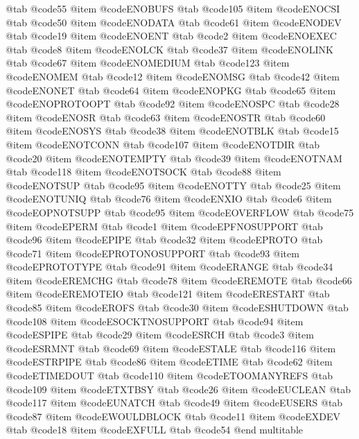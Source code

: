 @tab @code{55}
@item @code{ENOBUFS}
@tab @code{105}
@item @code{ENOCSI}
@tab @code{50}
@item @code{ENODATA}
@tab @code{61}
@item @code{ENODEV}
@tab @code{19}
@item @code{ENOENT}
@tab @code{2}
@item @code{ENOEXEC}
@tab @code{8}
@item @code{ENOLCK}
@tab @code{37}
@item @code{ENOLINK}
@tab @code{67}
@item @code{ENOMEDIUM}
@tab @code{123}
@item @code{ENOMEM}
@tab @code{12}
@item @code{ENOMSG}
@tab @code{42}
@item @code{ENONET}
@tab @code{64}
@item @code{ENOPKG}
@tab @code{65}
@item @code{ENOPROTOOPT}
@tab @code{92}
@item @code{ENOSPC}
@tab @code{28}
@item @code{ENOSR}
@tab @code{63}
@item @code{ENOSTR}
@tab @code{60}
@item @code{ENOSYS}
@tab @code{38}
@item @code{ENOTBLK}
@tab @code{15}
@item @code{ENOTCONN}
@tab @code{107}
@item @code{ENOTDIR}
@tab @code{20}
@item @code{ENOTEMPTY}
@tab @code{39}
@item @code{ENOTNAM}
@tab @code{118}
@item @code{ENOTSOCK}
@tab @code{88}
@item @code{ENOTSUP}
@tab @code{95}
@item @code{ENOTTY}
@tab @code{25}
@item @code{ENOTUNIQ}
@tab @code{76}
@item @code{ENXIO}
@tab @code{6}
@item @code{EOPNOTSUPP}
@tab @code{95}
@item @code{EOVERFLOW}
@tab @code{75}
@item @code{EPERM}
@tab @code{1}
@item @code{EPFNOSUPPORT}
@tab @code{96}
@item @code{EPIPE}
@tab @code{32}
@item @code{EPROTO}
@tab @code{71}
@item @code{EPROTONOSUPPORT}
@tab @code{93}
@item @code{EPROTOTYPE}
@tab @code{91}
@item @code{ERANGE}
@tab @code{34}
@item @code{EREMCHG}
@tab @code{78}
@item @code{EREMOTE}
@tab @code{66}
@item @code{EREMOTEIO}
@tab @code{121}
@item @code{ERESTART}
@tab @code{85}
@item @code{EROFS}
@tab @code{30}
@item @code{ESHUTDOWN}
@tab @code{108}
@item @code{ESOCKTNOSUPPORT}
@tab @code{94}
@item @code{ESPIPE}
@tab @code{29}
@item @code{ESRCH}
@tab @code{3}
@item @code{ESRMNT}
@tab @code{69}
@item @code{ESTALE}
@tab @code{116}
@item @code{ESTRPIPE}
@tab @code{86}
@item @code{ETIME}
@tab @code{62}
@item @code{ETIMEDOUT}
@tab @code{110}
@item @code{ETOOMANYREFS}
@tab @code{109}
@item @code{ETXTBSY}
@tab @code{26}
@item @code{EUCLEAN}
@tab @code{117}
@item @code{EUNATCH}
@tab @code{49}
@item @code{EUSERS}
@tab @code{87}
@item @code{EWOULDBLOCK}
@tab @code{11}
@item @code{EXDEV}
@tab @code{18}
@item @code{EXFULL}
@tab @code{54}
@end multitable

